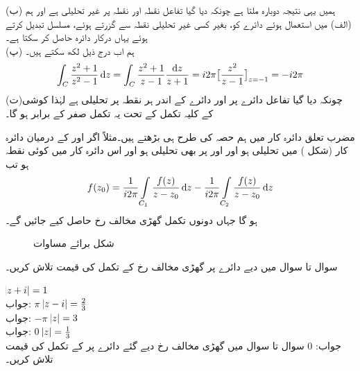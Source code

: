 (ب) \quad ہمیں یہی نتیجہ دوبارہ ملتا ہے چونکہ دیا گیا تفاعل نقطہ  اور نقطہ  پر غیر تحلیلی ہے اور ہم (الف) میں استعمال ہوئے دائرے کو، بغیر کسی غیر تحلیلی نقطہ سے گزرتے ہوئے، مسلسل تبدیل کرتے ہوئے یہاں درکار دائرہ حاصل کر سکتا ہے۔\\
(پ) \quad ہم اب درج ذیل لکھ سکتے ہیں۔
\begin{align*}
\int_C \frac{z^2+1}{z^2-1}\dif z=\int_C \frac{z^2+1}{z-1}\frac{\dif z}{z+1}=i2\pi\big[\frac{z^2}{z-1}\big]_{z=-1}=-i2\pi
\end{align*}
(ت)\quad چونکہ دیا گیا تفاعل دائرے پر اور دائرے کے اندر ہر نقطہ پر تحلیلی ہے لہٰذا کوشی کے کلیہ تکمل کے تحت یہ تکمل صفر کے برابر ہو گا۔ 


مضرب تعلق دائرہ کار میں ہم حصہ  کی طرح ہی بڑھتے ہیں۔مثلاً اگر  اور   کے درمیان دائرہ کار (شکل ) میں  تحلیلی ہو اور  اور  پر بھی  تحلیلی ہو اور اس دائرہ کار میں  کوئی نقطہ ہو تب
\begin{align}\label{مساوات_مخلوط_تکمل_کوشی_کلیہ_تکمل_پ}
f(z_0)=\frac{1}{i2\pi}\int\limits_{C_1}\frac{f(z)}{z-z_0}\dif z-\frac{1}{i2\pi}\int\limits_{C_2} \frac{f(z)}{z-z_0}\dif z
\end{align}
ہو گا جہاں دونوں تکمل گھڑی مخالف رخ حاصل کیے جائیں گے۔
\begin{figure}
\centering
{}
\caption{شکل برائے مساوات }
\label{شکل_مساوات_مخلوط_تکمل_کوشی_کلیہ_تکمل_پ}
\end{figure}

سوال  تا سوال  میں دیے دائرے پر گھڑی مخالف رخ  کے تکمل کی قیمت تلاش کریں۔

\quad
$\abs{z+i}=1$\\
جواب:\quad
$\pi$
\quad
$\abs{z-i}=\tfrac{2}{3}$\\
جواب:\quad
$-\pi$
\quad
$\abs{z}=3$\\
جواب:\quad
$0$
\quad
$\abs{z}=\tfrac{1}{3}$\\
جواب:\quad
$0$
سوال  تا سوال  میں گھڑی مخالف رخ دیے گئے  دائرے پر  کے تکمل کی قیمت تلاش کریں۔ 

